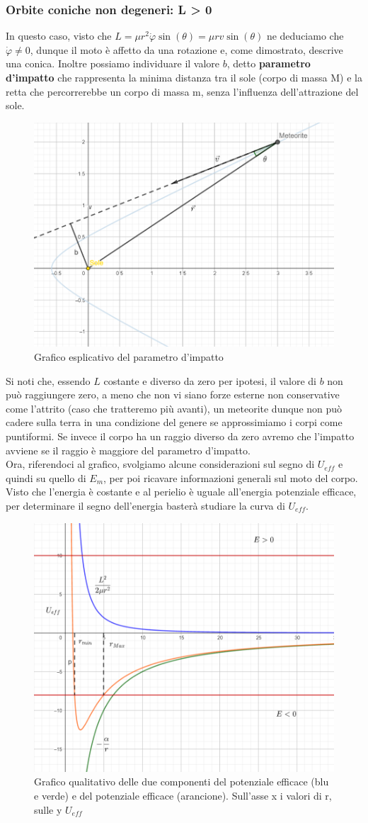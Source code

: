 \subsubsection*{Orbite coniche non degeneri: L > 0}
In questo caso, visto che $L = \mu r^2 \dot{\varphi} \sin(\theta) =  \mu r v \sin(\theta) $ ne deduciamo che $\dot{\varphi}\neq 0$, dunque il moto è affetto da una rotazione e, come dimostrato, descrive una conica. Inoltre possiamo individuare il valore $b$, detto \textbf{parametro d'impatto} che rappresenta la minima distanza tra il sole (corpo di massa M) e la retta che percorrerebbe un corpo di massa m, senza l'influenza dell'attrazione del sole.
\begin{figure}[h!]
	\centering
	\includegraphics[width=0.5\linewidth]{../images/meteorite}
	\caption{Grafico esplicativo del parametro d'impatto}
	\label{fig:meteorite}
\end{figure}
\FloatBarrier
Si noti che, essendo $L$ costante e diverso da zero per ipotesi, il valore di $b$ non può raggiungere zero, a meno che non vi siano forze esterne non conservative come l'attrito (caso che tratteremo più avanti), un meteorite dunque non può cadere sulla terra in una condizione del genere se approssimiamo i corpi come puntiformi. Se invece il corpo ha un raggio diverso da zero avremo che l'impatto avviene se il raggio è maggiore del parametro d'impatto.\\
Ora, riferendoci al grafico, svolgiamo alcune considerazioni sul segno di $U_{eff}$ e quindi su quello di $E_m$, per poi ricavare informazioni generali sul moto del corpo. Visto che l'energia è costante e al perielio è uguale all'energia potenziale efficace, per determinare il segno dell'energia basterà studiare la curva di $U_{eff}$.\\
\begin{figure}[h!]
	\centering
	\includegraphics[width=0.5\linewidth]{../images/potenziale_efficace}
	\caption{Grafico qualitativo delle due componenti del potenziale efficace (blu e verde) e del potenziale efficace (arancione). Sull'asse x i valori di r, sulle y $U_{eff}$}
	\label{fig:potenzialeefficace}
\end{figure}\FloatBarrier
